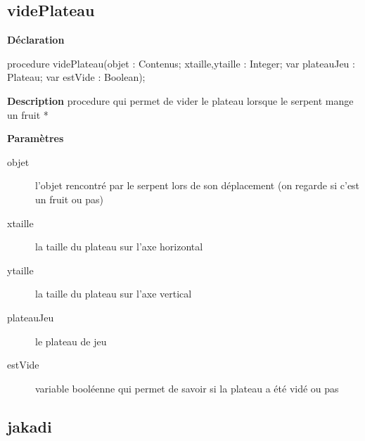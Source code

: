 \documentclass{report}
\newif\ifpdf
\begin{document}
\subsection*{videPlateau}
\fi
\label{Jouer-videPlateau}
\begin{list}{}{
\setlength{\itemindent}{0cm}
\setlength{\listparindent}{0cm}
\setlength{\leftmargin}{\evensidemargin}
\addtolength{\leftmargin}{\tmplength}
\settowidth{\labelsep}{X}
\addtolength{\leftmargin}{\labelsep}
\setlength{\labelwidth}{\tmplength}
}
\item[\textbf{Déclaration}\hfill]
\ifpdf
\begin{flushleft}
\fi
\begin{ttfamily}
procedure videPlateau(objet : Contenus; xtaille,ytaille : Integer; var plateauJeu : Plateau; var estVide : Boolean);\end{ttfamily}

\ifpdf
\end{flushleft}
\fi

\par
\item[\textbf{Description}]
procedure qui permet de vider le plateau lorsque le serpent mange un fruit      *\par
\item[\textbf{Paramètres}]
\begin{description}
\item[objet] l'objet rencontré par le serpent lors de son déplacement (on regarde si c'est un fruit ou pas)
\item[xtaille] la taille du plateau sur l'axe horizontal
\item[ytaille] la taille du plateau sur l'axe vertical
\item[plateauJeu] le plateau de jeu
\item[estVide] variable booléenne qui permet de savoir si la plateau a été vidé ou pas
\end{description}


\end{list}
\ifpdf
\subsection*{\large{\textbf{jakadi}}\normalsize\hspace{1ex}\hrulefill}
\else
\end{document}
